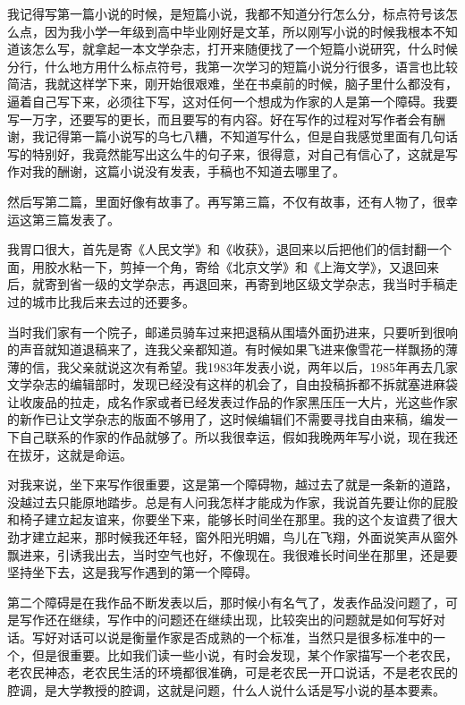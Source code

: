 \documentclass[12pt,a5paper]{ctexbook}
\begin{document}
我记得写第一篇小说的时候，是短篇小说，我都不知道分行怎么分，标点符号该怎么点，因为我小学一年级到高中毕业刚好是文革，所以刚写小说的时候我根本不知道该怎么写，就拿起一本文学杂志，打开来随便找了一个短篇小说研究，什么时候分行，什么地方用什么标点符号，我第一次学习的短篇小说分行很多，语言也比较简洁，我就这样学下来，刚开始很艰难，坐在书桌前的时候，脑子里什么都没有，逼着自己写下来，必须往下写，这对任何一个想成为作家的人是第一个障碍。我要写一万字，还要写的更长，而且要写的有内容。好在写作的过程对写作者会有酬谢，我记得第一篇小说写的乌七八糟，不知道写什么，但是自我感觉里面有几句话写的特别好，我竟然能写出这么牛的句子来，很得意，对自己有信心了，这就是写作对我的酬谢，这篇小说没有发表，手稿也不知道去哪里了。

然后写第二篇，里面好像有故事了。再写第三篇，不仅有故事，还有人物了，很幸运这第三篇发表了。

我胃口很大，首先是寄《人民文学》和《收获》，退回来以后把他们的信封翻一个面，用胶水粘一下，剪掉一个角，寄给《北京文学》和《上海文学》，又退回来后，就寄到省一级的文学杂志，再退回来，再寄到地区级文学杂志，我当时手稿走过的城市比我后来去过的还要多。

当时我们家有一个院子，邮递员骑车过来把退稿从围墙外面扔进来，只要听到很响的声音就知道退稿来了，连我父亲都知道。有时候如果飞进来像雪花一样飘扬的薄薄的信，我父亲就说这次有希望。我1983年发表小说，两年以后，1985年再去几家文学杂志的编辑部时，发现已经没有这样的机会了，自由投稿拆都不拆就塞进麻袋让收废品的拉走，成名作家或者已经发表过作品的作家黑压压一大片，光这些作家的新作已让文学杂志的版面不够用了，这时候编辑们不需要寻找自由来稿，编发一下自己联系的作家的作品就够了。所以我很幸运，假如我晚两年写小说，现在我还在拔牙，这就是命运。

对我来说，坐下来写作很重要，这是第一个障碍物，越过去了就是一条新的道路，没越过去只能原地踏步。总是有人问我怎样才能成为作家，我说首先要让你的屁股和椅子建立起友谊来，你要坐下来，能够长时间坐在那里。我的这个友谊费了很大劲才建立起来，那时候我还年轻，窗外阳光明媚，鸟儿在飞翔，外面说笑声从窗外飘进来，引诱我出去，当时空气也好，不像现在。我很难长时间坐在那里，还是要坚持坐下去，这是我写作遇到的第一个障碍。

第二个障碍是在我作品不断发表以后，那时候小有名气了，发表作品没问题了，可是写作还在继续，写作中的问题还在继续出现，比较突出的问题就是如何写好对话。写好对话可以说是衡量作家是否成熟的一个标准，当然只是很多标准中的一个，但是很重要。比如我们读一些小说，有时会发现，某个作家描写一个老农民，老农民神态，老农民生活的环境都很准确，可是老农民一开口说话，不是老农民的腔调，是大学教授的腔调，这就是问题，什么人说什么话是写小说的基本要素。
\end{document}
